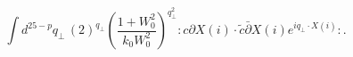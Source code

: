 \begin{equation} %
  \int d^{25-p}q_{\bot} \, (2)^{q_{\bot}} 
\left(\frac{1+W_0^2}{k_0 W_0^2} \right)^{q_{\bot}^2}
 :c\partial X(i)\cdot \tilde{c} \bar{\partial} X(i) e^{i q_{\bot}\cdot X(i)}:.
\end{equation} 

